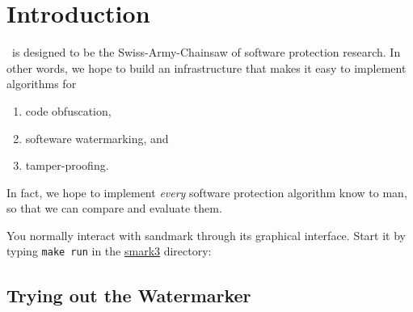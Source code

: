 \section{Introduction}
\SM\ is designed to be the Swiss-Army-Chainsaw of 
software protection research. In other words, we
hope to build an infrastructure that makes it
easy to implement algorithms for
\begin{enumerate}
   \item code obfuscation,
   \item softeware watermarking, and
   \item tamper-proofing.
\end{enumerate}
In fact, we hope to implement {\em every} 
software protection algorithm know to man, so 
that we can compare and evaluate them.

You normally interact with sandmark through its
graphical interface. Start it by typing
{\tt make run} in the \url{smark3} directory:
\begin{center}
\end{center}


\subsection{Trying out the Watermarker}

